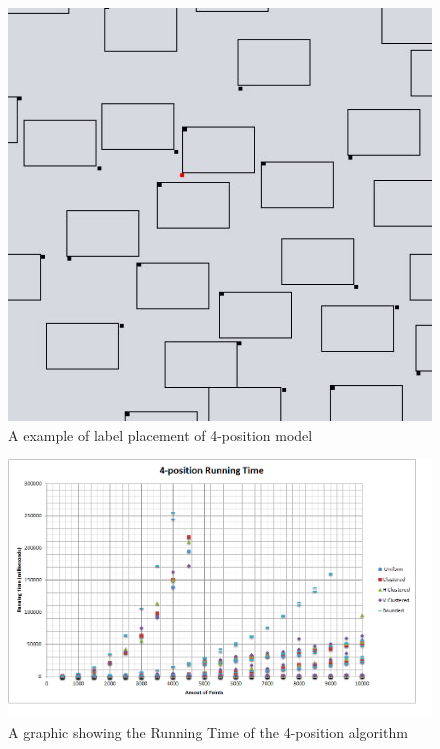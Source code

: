 \documentclass[crop=false,a4paper,oneside,11pt]{standalone}
\begin{document}
\begin{figure}[h!]
 \centering
  \centerline{\includegraphics[scale = 0.4]{4pos_example.JPG}}
  \caption{A example of label placement of 4-position model}
 \end{figure}

 \begin{figure}[h!]
 \centering
 \centerline{\includegraphics[scale = 0.6]{4PosRunningTime.png}}
 \caption{A graphic showing the Running Time of the 4-position algorithm}
 \end{figure}
\end{document}
